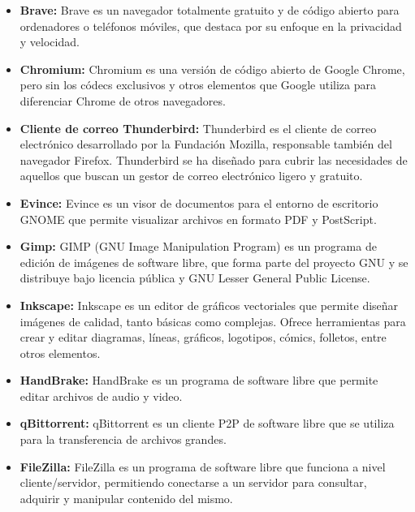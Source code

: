 		\begin{itemize}
			\item \textbf{Brave:} Brave es un navegador totalmente gratuito y de código abierto para ordenadores o teléfonos móviles, que destaca por su enfoque en la privacidad y velocidad.

			\item\textbf{Chromium:} Chromium es una versión de código abierto de Google Chrome, pero sin los códecs exclusivos y otros elementos que Google utiliza para diferenciar Chrome de otros navegadores.

			\item \textbf{Cliente de correo Thunderbird:} Thunderbird es el cliente de correo electrónico desarrollado por la Fundación Mozilla, responsable también del navegador Firefox. Thunderbird se ha diseñado para cubrir las necesidades de aquellos que buscan un gestor de correo electrónico ligero y gratuito.
			
			\item\textbf{Evince:} Evince es un visor de documentos para el entorno de escritorio GNOME que permite visualizar archivos en formato PDF y PostScript.
			
			\item\textbf{Gimp:} GIMP (GNU Image Manipulation Program) es un programa de edición de imágenes de software libre, que forma parte del proyecto GNU y se distribuye bajo licencia pública y GNU Lesser General Public License.
			
			\item\textbf{Inkscape:} Inkscape es un editor de gráficos vectoriales que permite diseñar imágenes de calidad, tanto básicas como complejas. Ofrece herramientas para crear y editar diagramas, líneas, gráficos, logotipos, cómics, folletos, entre otros elementos.
			
			\item\textbf{HandBrake:} HandBrake es un programa de software libre que permite editar archivos de audio y video.
			
			\item\textbf{qBittorrent:} qBittorrent es un cliente P2P de software libre que se utiliza para la transferencia de archivos grandes.
			
			\item\textbf{FileZilla:} FileZilla es un programa de software libre que funciona a nivel cliente/servidor, permitiendo conectarse a un servidor para consultar, adquirir y manipular contenido del mismo.
			

\end{itemize}
